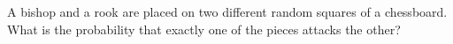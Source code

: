 A bishop and a rook are placed on two different random squares of a chessboard. What is the probability that exactly one of the pieces attacks the other?

